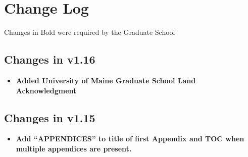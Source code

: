 \chapter{Change Log}
Changes in Bold were required by the Graduate School

\section{Changes in v1.16}
\begin{itemize}
\item{\bfseries Added University of Maine Graduate School Land Acknowledgment}
\end{itemize}

\section{Changes in v1.15}
\begin{itemize}
\item{\bfseries Add “APPENDICES” to title of first Appendix and TOC when multiple appendices are present.}
\end{itemize}

